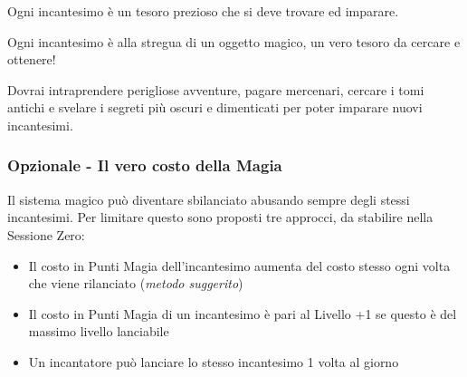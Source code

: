 \begin{multicols}{2}

\begin{changemargin}{0.3cm}{0.3cm}\begin{tcolorbox}[title = Scegliere gli Incantesimi]
Ogni incantesimo è un tesoro prezioso che si deve trovare ed imparare.

Ogni incantesimo è alla stregua di un oggetto magico, un vero tesoro da cercare e ottenere!

Dovrai intraprendere perigliose avventure, pagare mercenari, cercare i tomi antichi e svelare i segreti più oscuri e dimenticati per poter imparare nuovi incantesimi.
\end{tcolorbox}\end{changemargin}

\subsubsection{Opzionale - Il vero costo della Magia}

Il sistema magico può diventare sbilanciato abusando sempre degli stessi incantesimi. Per limitare questo sono proposti tre approcci, da stabilire nella Sessione Zero:

\begin{itemize}[leftmargin=*] \setlength{\itemsep}{0pt}
\item Il costo in Punti Magia dell'incantesimo aumenta del costo stesso ogni volta che viene rilanciato (\emph{metodo suggerito})
\item Il costo in Punti Magia di un incantesimo è pari al Livello +1 se questo è del massimo livello lanciabile
\item Un incantatore può lanciare lo stesso incantesimo 1 volta al giorno
\end{itemize}


\end{multicols}
